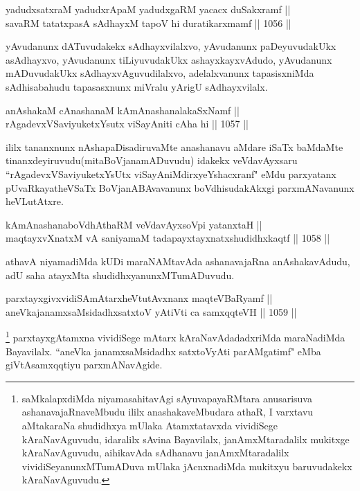 \begin{shl}
yadudxsatxraM yadudxrApaM yadudxgaRM yacacx duSakxramf || \\
savaRM tatatxpasA sAdhayxM tapoV hi duratikarxmamf ||  1056 ||  
\end{shl}

\begin{artha}
yAvudanunx dATuvudakekx sAdhayxvilalxvo, yAvudanunx paDeyuvudakUkx asAdhayxvo, yAvudanunx tiLiyuvudakUkx ashayxkayxvAdudo, yAvudanunx mADuvudakUkx sAdhayxvAguvudilalxvo, adelalxvanunx tapasisxniMda sAdhisabahudu tapasasxnunx miVralu yArigU sAdhayxvilalx.
\end{artha}


\begin{shl}
anAshakaM cAnashanaM kAmAnashanalakaSxNamf ||  \\
rAgadevxVSaviyuketxYsutx viSayAniti cA\s \s ha hi ||  1057 ||  
\end{shl}
				
\begin{artha}
ililx tananxnunx nAshapaDisadiruvaMte anashanavu aMdare iSaTx baMdaMte tinanxdeyiruvudu(mitaBoVjanamADuvudu) idakekx veVdavAyxsaru ``rAgadevxVSaviyuketxYsUtx viSayAniMdirxyeYshacxranf" eMdu parxyatanx pUvaRkayatheVSaTx BoVjanABAvavanunx boVdhisudakAkxgi parxmANavanunx heVLutAtxre.
\end{artha}				
				
\begin{shl}
kAmAnashanaboVdhAthaRM veVdavAyxsoV\s pi yatanxtaH || \\
maqtayxvXnatxM vA saniyamaM tadapayxtayxnatxshudidhxkaqtf ||  1058 ||  
\end{shl}

\begin{artha}
athavA niyamadiMda kUDi maraNAMtavAda ashanavajaRna anAshakavAdudu, adU saha atayxMta shudidhxyanunxMTumADuvudu.
\end{artha}

\begin{shl}
parxtayxgivxvidiSAmAtarxheVtutAvxnanx maqteVBaRyamf ||  \\
aneVkajanamxsaMsidadhxsatxtoV yAtiVti ca samxqqteVH ||  1059 ||  
\end{shl}

\begin{artha}
\footnote{saMkalapxdiMda niyamasahitavAgi sAyuvapayaRMtara anusarisuva ashanavajaRnaveMbudu ililx anashakaveMbudara athaR, I varxtavu aMtakaraNa shudidhxya mUlaka Atamxtatavxda vividiSege kAraNavAguvudu, idaralilx sAvina Bayavilalx, janAmxMtaradalilx mukitxge kAraNavAguvudu, aihikavAda sAdhanavu janAmxMtaradalilx vividiSeyanunxMTumADuva mUlaka jAcnxnadiMda mukitxyu baruvudakekx kAraNavAguvudu.} parxtayxgAtamxna vividiSege mAtarx kAraNavAdadadxriMda maraNadiMda Bayavilalx. ``aneVka janamxsaMsidadhx satxtoVyAti parAMgatimf" eMba giVtAsamxqqtiyu parxmANavAgide.
\end{artha}

